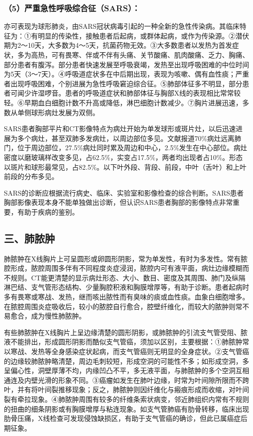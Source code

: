\subsubsection{（5）严重急性呼吸综合征（SARS）：}

亦可表现为球形肺炎，由SARS冠状病毒引起的一种全新的急性传染病。其临床特征为：①有明显的传染性，接触患者后起病，或群体起病，或作为传染源。②潜伏期为2～10天，大多数为4～5天，抗菌药物无效。③大多数患者以发热为首发症状，多为高热，可有畏寒、伴或不伴有头痛、关节酸痛、肌肉酸痛、乏力、胸痛、部分患者有腹泻。部分患者快速发展至呼吸衰竭，发热至出现呼吸困难的中位时间为5天（3～7天）。④呼吸道症状多在中后期出现，表现为咳嗽、偶有血性痰；严重者出现呼吸困难，个别进展为急性呼吸窘迫综合征。⑤肺部体征多不明显，部分患者可闻少许湿啰音。患者的呼吸道症状和肺部体征与胸部X线的表现相比常常较轻。⑥早期血白细胞计数不升高或降低，淋巴细胞计数减少。⑦胸片进展迅速，多数从单侧球形病灶发展为双侧。

SARS患者胸部平片和CT影像特点为病灶开始为单发球形或斑片灶，以后迅速进展为多个病灶，甚至双肺多发病灶，以周边部位多见。文献报道70\%病灶远离肺门，位于周边部位，27.5\%病灶同时累及周边和中心，2.5\%发生在中心部位。病灶密度以磨玻璃样改变多见，占62.5\%，实变占17.5\%，两者均出现者占10\%。形态以斑片和球形最常见，占82.5\%。以下叶外段、背段、前段，中叶（舌叶）和上叶前段的分布多见。

SARS的诊断应根据流行病史、临床、实验室和影像检查的综合判断。SARS患者胸部影像表现本身不能单独做出诊断，但认识SARS患者胸部的影像特点非常重要，有助于疾病的鉴别。

\subsection{三、肺脓肿}

肺脓肿在X线胸片上可呈圆形或卵圆形阴影，常为单发性，有时为多发性。常有脓腔形成，脓腔周围多伴有不同程度炎症浸润，脓腔内可有液平面，病灶边缘模糊而不规则。CT能更清楚的显示病灶形态、大小、数目、密度及其周围、肺门及纵隔淋巴结、支气管形态结构、少量胸腔积液和胸膜增厚等，有助于诊断。患者起病时多有畏寒或寒战、发热，继而咳出脓性而有臭味的痰或血性痰。血象白细胞增多。在脓腔周围炎症吸收后，较小的脓腔自行愈合，腔壁纤维化，而较大的脓肿则常不易愈合，成为慢性肺脓肿。

有些肺脓肿在X线胸片上呈边缘清楚的圆形阴影，或肺脓肿的引流支气管受阻、脓液不能排出，形成圆形阴影而酷似支气管癌，须加以区别，主要根据：①肺脓肿常以寒战、发热等全身感染症状起病，而支气管癌则无明显的全身症状。②支气管癌的边缘较肺脓肿略清楚，周边毛刺较短，形成空洞的可能性不多；如形成空洞，多呈偏心性，洞壁厚薄不均，内缘凹凸不平，多无液平面，与肺脓肿的多个空洞互相通连及内壁光滑的形象不同。③癌瘤如发生在肺叶边缘，时常为叶间隙所限而不跨叶，并有将叶间裂推移现象；反之，肺脓肿则因纤维化与瘢痕形成而收缩，对叶间裂有牵拉现象。④肺脓肿周围有较多的纤维条索状病变，邻近肺组织内常有不规则的扭曲的细条阴影或有胸膜增厚与粘连现象。如支气管肺癌有肋骨转移，临床出现肋骨压痛，X线检查可发现侵蚀缺损区，有助于支气管癌的确诊，但此已属癌症后期征象。

